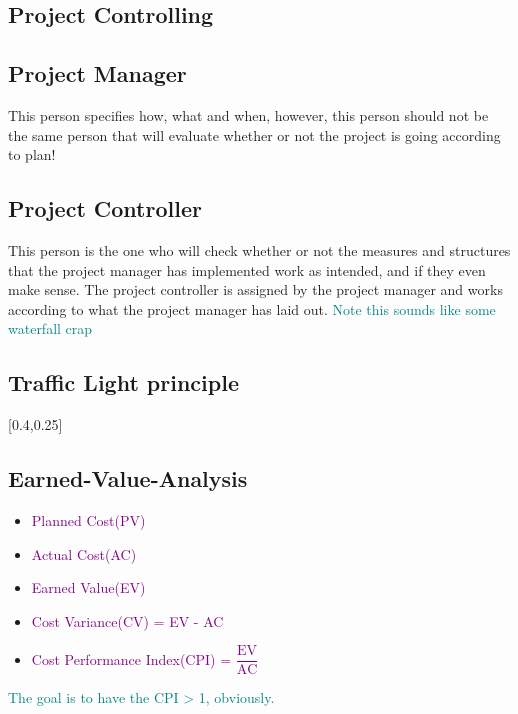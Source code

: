 \documentclass[main.tex,fontsize=12pt,paper=a4,paper=landscape,DIV=calc,]{scrartcl}
\begin{document}
\begin{multicols*}{2}
\section{Project Controlling}
\subsection{Project Manager}
This person specifies how, what and when, however, this person should not be the same person that will evaluate whether or not the project is going according to plan! \newline

\subsection{Project Controller}
This person is the one who will check whether or not the measures and structures that the project manager has implemented work as intended, and if they even make sense.\newline
The project controller is assigned by the project manager and works according to what the project manager has laid out.\newline
\textcolor{teal}{Note this sounds like some waterfall crap}\newline

\subsection{Traffic Light principle}
[0.4,0.25]

\subsection{Earned-Value-Analysis}
\begin{itemize}
  \item \textcolor{purple}{Planned Cost(PV)}
\item \textcolor{purple}{Actual Cost(AC)}
\item \textcolor{purple}{Earned Value(EV)}
\item \textcolor{purple}{Cost Variance(CV) = EV - AC}\newline
\item \textcolor{purple}{Cost Performance Index(CPI) = \(\dfrac{\text{EV}}{\text{AC}}\)}
\end{itemize} 
\textcolor{teal}{The goal is to have the CPI > 1, obviously.}


\end{multicols*}
\end{document}

